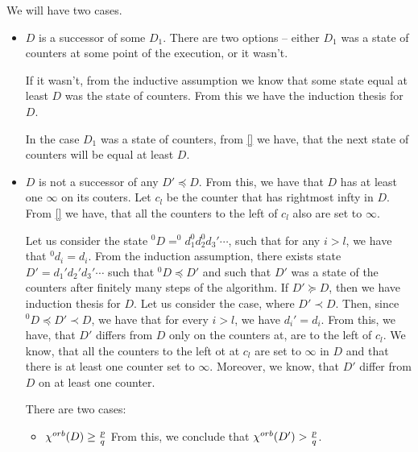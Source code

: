 We will have two cases. 
\begin{itemize}
\item $D$ is a successor of some $D_1$. 
There are two options -- either $D_1$ was a state of counters 
at some point of the execution, or it wasn't. 

If it wasn't, from the inductive assumption we know 
that some state equal at least $D$ was the state of counters. From this we have the induction 
thesis for $D$.

In the case $D_1$ was a state of counters, from \ref{} we have, that the next 
state of counters will be equal at least $D$.  




% 


\item $D$ is not a successor of any $D' \preceq D$. From this, we have that $D$ has at least one 
$\infty$ on its couters.  
Let $c_l$ be the counter that has rightmost infty in $D$. 
From \ref{} we have, that all the counters to the left of $c_l$ also are set to $\infty$.

Let us consider the state $^0D = ^0d_1^0d_2^0d_3'\cdots$, such that for any $i > l$, we have that 
$^0d_i = d_i$. From the induction assumption, there exists state $D' = d_1'd_2'd_3'\cdots$ 
such that $^0D\preceq D'$ and such that $D'$ was a state of the counters after finitely 
many steps of the algorithm. If $D' \succeq D$, then we have induction thesis for $D$. 
Let us consider the case, where $D' \prec D$. Then, since $^0D \preceq D' \prec D$, we have 
that for every $i > l$, we have $d_i' = d_i$. From this, we have, that $D'$ differs from 
$D$ only on the counters at, are to the left of $c_l$. We know, that all the counters 
to the left ot at $c_l$
are set to $\infty$ in $D$ and that there is at least one counter set to $\infty$. 
Moreover, we know, that $D'$ differ from $D$ on at least one counter.

There are two cases:
\begin{itemize}
\item ${\chi^{orb}(D)} \geq \frac{p}{q}$ 
From this, we conclude 
that ${\chi^{orb}(D')} > \frac{p}{q}$. 


\end{itemize}
\end{itemize}
